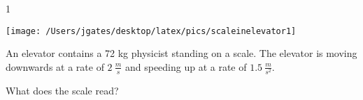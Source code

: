 
\AddToShipoutPicture*{\BackgroundPic}

\addtocounter {ProbNum} {1}

\begin{floatingfigure}[r]{.2\textwidth}
\texttt{[image: /Users/jgates/desktop/latex/pics/scaleinelevator1]}
\end{floatingfigure}
 
{\bf \Large{}} An elevator contains a 72 kg physicist standing on a scale. The elevator is moving downwards at a rate of ${2~\tfrac{m}{s}}$ and speeding up at a rate of ${1.5~\tfrac{m}{s^2}}$.

\bigskip
What does the scale read?




\vfill
\newpage

